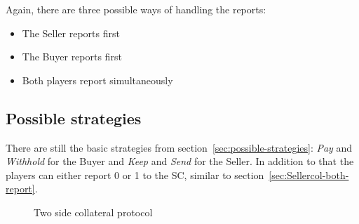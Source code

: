 \documentclass{cacthesis}
\begin{document}
Again, there are three possible ways of handling the reports:
\begin{itemize}
    \item The Seller reports first
    \item The Buyer reports first
    \item Both players report simultaneously
\end{itemize}


\subsection{Possible strategies}
There are still the basic strategies from section~\ref{sec:possible-strategies}: \emph{Pay} and \emph{Withhold} for the Buyer and \emph{Keep} and \emph{Send} for the Seller. In addition to that the players can either report 0 or 1 to the SC, similar to section~\ref{sec:Sellercol-both-report}.
\newpage
\begin{figure}[htb!]
 \centering
    \caption{Two side collateral protocol} 
    \label{fig:diagram-twocol}
\end{figure} 
\end{document}
